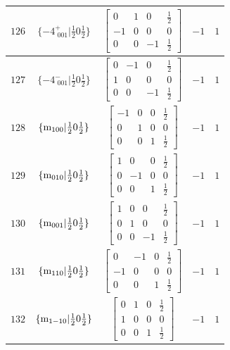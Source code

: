 \documentclass[fleqn,8pt]{jsarticle}
\begin{document}
\begin{longtable}{ccccc}
$ 126 $ & $ \{-4^{+}_{\,\,001}|\frac{1}{2} 0 \frac{1}{2}\} $ & $ \begin{bmatrix} 0 & 1 & 0 & \frac{1}{2} \\ -1 & 0 & 0 & 0 \\ 0 & 0 & -1 & \frac{1}{2} \end{bmatrix} $ & $ -1 $ & $ 1 $ \\ \hline
$ 127 $ & $ \{-4^{-}_{\,\,001}|\frac{1}{2} 0 \frac{1}{2}\} $ & $ \begin{bmatrix} 0 & -1 & 0 & \frac{1}{2} \\ 1 & 0 & 0 & 0 \\ 0 & 0 & -1 & \frac{1}{2} \end{bmatrix} $ & $ -1 $ & $ 1 $ \\ \hline
$ 128 $ & $ \{{\rm m}_{100}|\frac{1}{2} 0 \frac{1}{2}\} $ & $ \begin{bmatrix} -1 & 0 & 0 & \frac{1}{2} \\ 0 & 1 & 0 & 0 \\ 0 & 0 & 1 & \frac{1}{2} \end{bmatrix} $ & $ -1 $ & $ 1 $ \\ \hline
$ 129 $ & $ \{{\rm m}_{010}|\frac{1}{2} 0 \frac{1}{2}\} $ & $ \begin{bmatrix} 1 & 0 & 0 & \frac{1}{2} \\ 0 & -1 & 0 & 0 \\ 0 & 0 & 1 & \frac{1}{2} \end{bmatrix} $ & $ -1 $ & $ 1 $ \\ \hline
$ 130 $ & $ \{{\rm m}_{001}|\frac{1}{2} 0 \frac{1}{2}\} $ & $ \begin{bmatrix} 1 & 0 & 0 & \frac{1}{2} \\ 0 & 1 & 0 & 0 \\ 0 & 0 & -1 & \frac{1}{2} \end{bmatrix} $ & $ -1 $ & $ 1 $ \\ \hline
$ 131 $ & $ \{{\rm m}_{110}|\frac{1}{2} 0 \frac{1}{2}\} $ & $ \begin{bmatrix} 0 & -1 & 0 & \frac{1}{2} \\ -1 & 0 & 0 & 0 \\ 0 & 0 & 1 & \frac{1}{2} \end{bmatrix} $ & $ -1 $ & $ 1 $ \\ \hline
$ 132 $ & $ \{{\rm m}_{1-10}|\frac{1}{2} 0 \frac{1}{2}\} $ & $ \begin{bmatrix} 0 & 1 & 0 & \frac{1}{2} \\ 1 & 0 & 0 & 0 \\ 0 & 0 & 1 & \frac{1}{2} \end{bmatrix} $ & $ -1 $ & $ 1 $ \\ \hline

\end{longtable}
\end{document}
